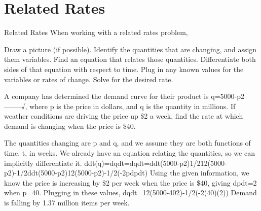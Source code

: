 \section{Related Rates}
\label{sec:related-rates}

Related Rates
When working with a related rates problem,

Draw a picture (if possible).
Identify the quantities that are changing, and assign them variables.
Find an equation that relates those quantities.
Differentiate both sides of that equation with respect to time.
Plug in any known values for the variables or rates of change.
Solve for the desired rate.
\begin{example}
A company has determined the demand curve for their product is q=5000-p2--------√, where p is the price in dollars, and q is the quantity in millions. If weather conditions are driving the price up \$2 a week, find the rate at which demand is changing when the price is \$40.

\begin{solution} The quantities changing are p and q, and we assume they are both functions of time, t, in weeks. We already have an equation relating the quantities, so we can implicitly differentiate it.
ddt(q)=dqdt=dqdt=ddt(5000-p2)1/212(5000-p2)-1/2ddt(5000-p2)12(5000-p2)-1/2(-2pdpdt)
Using the given information, we know the price is increasing by \$2 per week when the price is \$40, giving dpdt=2 when p=40. Plugging in these values,
dqdt=12(5000-402)-1/2(-2(40)(2))
Demand is falling by 1.37 million items per week.
\end{solution}\end{example}
